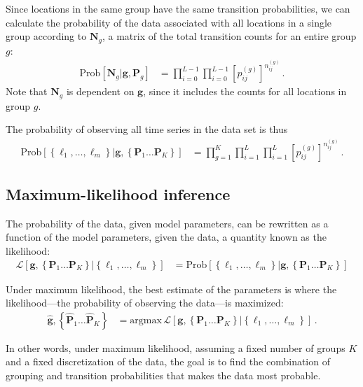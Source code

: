 \documentclass[12pt]{article}
\newcommand{\bg}{\mathbf{g}}
\newcommand{\bP}{\mathbf{P}}
\newcommand{\boldell}{\boldsymbol{\ell}}
\newcommand{\bN}{\mathbf{N}}
\newcommand{\Prob}{\mathrm{Prob}}
\newcommand{\like}{\mathcal{L}}
\newcommand{\argmax}{\mathrm{argmax}}
\begin{document}
Since locations in the same group have the same transition probabilities, we can calculate the probability of the data associated with all locations in a single group according to $\bN_g$, a matrix of the total transition counts for an entire group $g$:
\begin{align}
	\Prob\left[\bN_g | \bg, \bP_{g}\right]
	&= \prod_{i=0}^{L-1} \prod_{i=0}^{L-1} \left[p_{ij}^{(g)}\right]^{n_{ij}^{(g)}} \, .
\end{align}
Note that $\bN_g$ is dependent on $\bg$, since it includes the counts for all locations in group $g$.

The probability of observing all time series in the data set is thus
\begin{align}
	\Prob\left[\left\{\boldell_1, \ldots, \boldell_m\right\} | \bg, 
		\left\{ \bP_1 \ldots \bP_K \right\} \right]
	&= \prod_{g=1}^K \prod_{i=1}^{L} \prod_{i=1}^{L}
		\left[p_{ij}^{(g)}\right]^{n_{ij}^{(g)}} \, .
\end{align}

\subsection{Maximum-likelihood inference}
\label{model-ml}

The probability of the data, given model parameters, can be rewritten as a function of the model parameters, given the data, a quantity known as the likelihood:
\begin{align}
	\like\left[\bg,  \left\{ \bP_1 \ldots \bP_K \right\} | \left\{\boldell_1, \ldots, \boldell_m\right\} \right]
	&=
	\Prob\left[\left\{\boldell_1, \ldots, \boldell_m\right\} | \bg,  \left\{ \bP_1 \ldots \bP_K \right\} \right]
\end{align}

Under maximum likelihood, the best estimate of the parameters is where the likelihood---the probability of observing the data---is maximized:
\begin{align}
	\label{eq:mle}
	\hat{\bg}, \left\{ \hat{\bP}_1 \ldots \hat{\bP}_K \right\} &= \argmax \, \like\left[\bg,  \left\{ \bP_1 \ldots \bP_K \right\} | \left\{\boldell_1, \ldots, \boldell_m\right\} \right] \, .
\end{align}

In other words, under maximum likelihood, assuming a fixed number of groups $K$ and a fixed discretization of the data, the goal is to find the combination of grouping and transition probabilities that makes the data most probable.
\end{document}
